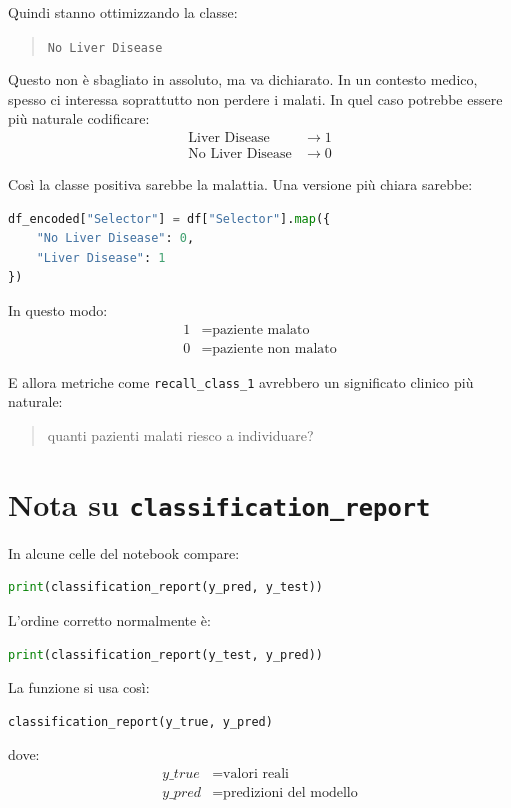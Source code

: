 \documentclass[11pt,a4paper]{article}
\begin{document}
Quindi stanno ottimizzando la classe:
\begin{quote}
    \texttt{No Liver Disease}
\end{quote}

Questo non è sbagliato in assoluto, ma va dichiarato. In un contesto medico, spesso ci interessa soprattutto non perdere i malati. In quel caso potrebbe essere più naturale codificare:
\begin{align*}
    \text{Liver Disease}     &\rightarrow 1 \\
    \text{No Liver Disease}  &\rightarrow 0
\end{align*}

Così la classe positiva sarebbe la malattia. Una versione più chiara sarebbe:
\begin{lstlisting}[language=Python]
df_encoded["Selector"] = df["Selector"].map({
    "No Liver Disease": 0,
    "Liver Disease": 1
})
\end{lstlisting}

In questo modo:
\begin{align*}
    1 &= \text{paziente malato} \\
    0 &= \text{paziente non malato}
\end{align*}

E allora metriche come \texttt{recall\_class\_1} avrebbero un significato clinico più naturale:
\begin{quote}
    quanti pazienti malati riesco a individuare?
\end{quote}

\section{Nota su \texttt{classification\_report}}
In alcune celle del notebook compare:
\begin{lstlisting}[language=Python]
print(classification_report(y_pred, y_test))
\end{lstlisting}

L'ordine corretto normalmente è:
\begin{lstlisting}[language=Python]
print(classification_report(y_test, y_pred))
\end{lstlisting}

La funzione si usa così:
\begin{lstlisting}[language=Python]
classification_report(y_true, y_pred)
\end{lstlisting}

dove:
\begin{align*}
    y\_true &= \text{valori reali} \\
    y\_pred &= \text{predizioni del modello}
\end{align*}
\end{document}
